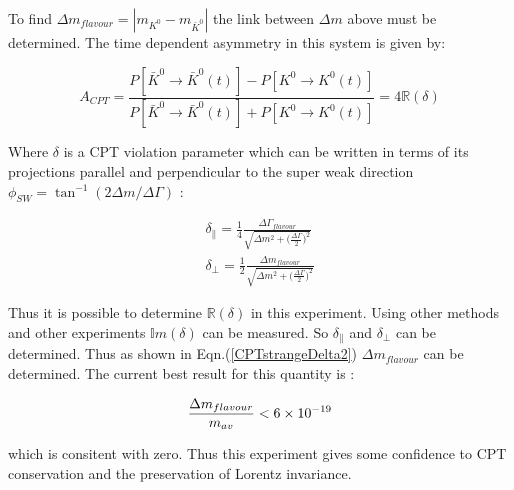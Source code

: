 To find ${\Delta m}_{flavour} = |m_{K^{0}} - m_{\bar{K}^{0}}|$ the link between $\Delta m$ above must be determined. The time dependent asymmetry in this system is given by:

\begin{equation*}
A_{CPT} = \frac{P[\bar{K}^{0} \rightarrow \bar{K}^{0}(t)] - P[{K}^{0} \rightarrow {K}^{0}(t)]}{P[\bar{K}^{0} \rightarrow \bar{K}^{0}(t)] + P[{K}^{0} \rightarrow {K}^{0}(t)]} = 4 \mathbb{R}({\delta})
\end{equation*}

\smallskip

\noindent Where $\delta$ is a CPT violation parameter which can be written in terms of its projections parallel and perpendicular to the super weak direction $\phi_{SW} = \tan^{-1} (2 \Delta m / \Delta \Gamma)$ \cite{PDGKaons}:

\begin{align}
\label{CPTstrangeDelta1}
\delta_{\parallel} = \frac{1}{4} \frac{{\Delta \Gamma}_{flavour}}{\sqrt{\Delta m^{2} + \big(\frac{\Delta \Gamma}{2} \big)^{2}}} \\
\label{CPTstrangeDelta2}
\delta_{\perp} = \frac{1}{2} \frac{{\Delta m}_{flavour}}{\sqrt{\Delta m^{2} + \big(\frac{\Delta \Gamma}{2} \big)^{2}}}
\end{align}

Thus it is possible to determine $\mathbb{R}({\delta})$ in this experiment. Using other methods and other experiments $\mathbb{I}m({\delta})$ can be measured. So $\delta_{\parallel}$ and $\delta_{\perp}$ can be determined. Thus as shown in Eqn.(\ref{CPTstrangeDelta2}) $\Delta m_{flavour}$ can be determined. The current best result for this quantity is \cite{PDGKaons}: 

$$\frac{\Delta m_{flavour}}{m_{av}} < 6 \times 10^{-19}$$ 

\noindent which is consitent with zero. Thus this experiment gives some confidence to CPT conservation and the preservation of Lorentz invariance.      
  
  
  
  
